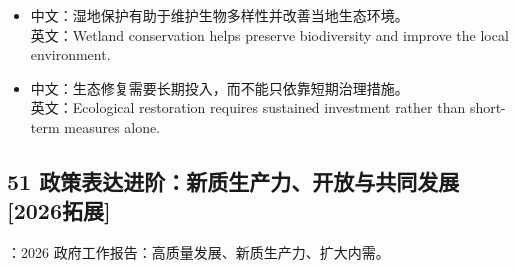 \documentclass[a4paper,11pt,UTF8,fontset=none]{ctexart}
\begin{document}
\begin{itemize}[leftmargin=1.7em,itemsep=1pt,parsep=0pt,topsep=2pt]
\item \noindent 中文：湿地保护有助于维护生物多样性并改善当地生态环境。\\ 英文：Wetland conservation helps preserve biodiversity and improve the local environment.\par


\item \noindent 中文：生态修复需要长期投入，而不能只依靠短期治理措施。\\ 英文：Ecological restoration requires sustained investment rather than short-term measures alone.\par


\end{itemize}

\subsection{51 政策表达进阶：新质生产力、开放与共同发展 {\color{AccentBlue} [2026拓展]}}

\begin{tcolorbox}[enhanced,breakable,boxrule=0.35pt,colback=VeryPaleBlue,colframe=AccentBlue!40,left=7pt,right=7pt,top=4pt,bottom=4pt,borderline west={2pt}{0pt}{AccentBlue},before skip=4pt,after skip=6pt]
：2026 政府工作报告：高质量发展、新质生产力、扩大内需。\par


\end{tcolorbox}
\end{document}
